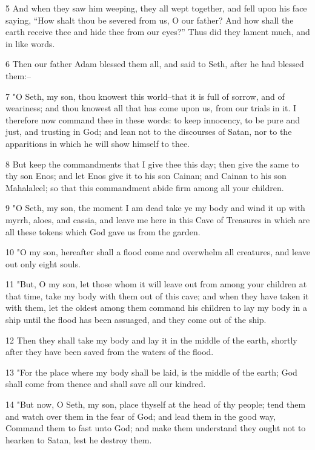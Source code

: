 \par 5 And when they saw him weeping, they all wept together, and fell upon his face saying, “How shalt thou be severed from us, O our father? And how shall the earth receive thee and hide thee from our eyes?” Thus did they lament much, and in like words.

\par 6 Then our father Adam blessed them all, and said to Seth, after he had blessed them:--

\par 7 "O Seth, my son, thou knowest this world--that it is full of sorrow, and of weariness; and thou knowest all that has come upon us, from our trials in it. I therefore now command thee in these words: to keep innocency, to be pure and just, and trusting in God; and lean not to the discourses of Satan, nor to the apparitions in which he will show himself to thee.

\par 8 But keep the commandments that I give thee this day; then give the same to thy son Enos; and let Enos give it to his son Cainan; and Cainan to his son Mahalaleel; so that this commandment abide firm among all your children.

\par 9 "O Seth, my son, the moment I am dead take ye my body and wind it up with myrrh, aloes, and cassia, and leave me here in this Cave of Treasures in which are all these tokens which God gave us from the garden.

\par 10 "O my son, hereafter shall a flood come and overwhelm all creatures, and leave out only eight souls.

\par 11 "But, O my son, let those whom it will leave out from among your children at that time, take my body with them out of this cave; and when they have taken it with them, let the oldest among them command his children to lay my body in a ship until the flood has been assuaged, and they come out of the ship.

\par 12 Then they shall take my body and lay it in the middle of the earth, shortly after they have been saved from the waters of the flood.

\par 13 "For the place where my body shall be laid, is the middle of the earth; God shall come from thence and shall save all our kindred.

\par 14 "But now, O Seth, my son, place thyself at the head of thy people; tend them and watch over them in the fear of God; and lead them in the good way, Command them to fast unto God; and make them understand they ought not to hearken to Satan, lest he destroy them.

